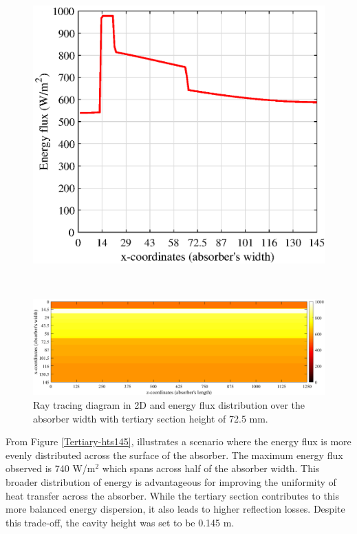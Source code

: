 \begin{figure}[ht!]
\begin{minipage}{0.48\columnwidth}
	\end{minipage}
	\begin{minipage}{0.48\columnwidth}
		\includegraphics[scale=0.45]{figs/Energy2D-hts72.eps}
	\end{minipage}
	\\[3mm]
	\begin{minipage}{1.0\columnwidth}
		\includegraphics[scale=0.40]{figs/Energy3D-hts72.png}
	\end{minipage}
	
	\caption{Ray tracing diagram in 2D and energy flux distribution over the absorber width with tertiary section height of 72.5 mm.}
	\label{Tertiary-hts72}
\end{figure}

\newpage
From Figure \ref{Tertiary-hts145}, illustrates a scenario where the energy flux is more evenly distributed across the surface of the absorber. The maximum energy flux observed is 740 W/m$^2$ which spans across half of the absorber width. This broader distribution of energy is advantageous for improving the uniformity of heat transfer across the absorber. While the tertiary section contributes to this more balanced energy dispersion, it also leads to higher reflection losses. Despite this trade-off, the cavity height was set to be 0.145 m.

